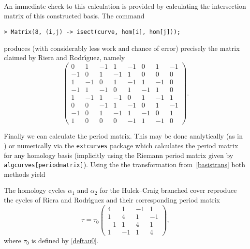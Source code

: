\documentclass[pdftex]{sigma}
\numberwithin{equation}{section}
\begin{document}
An immediate check to this calculation is provided by calculating the
intersection matrix of this constructed basis. The command
\begin{verbatim}
> Matrix(8, (i,j) -> isect(curve, hom[i], hom[j]));
\end{verbatim}
produces (with considerably less work and chance of error) precisely
the matrix claimed by Riera and Rodr{\'{\i}}guez, namely
\[
  \begin{pmatrix}
    0 & 1 & -1 & 1 & -1 & 0 & 1 & -1 \\
    -1 & 0 & 1 & -1 & 1 & 0 & 0 & 0 \\
    1 & -1 & 0 & 1 & -1 & 1 & -1 & 0 \\
    -1 & 1 & -1 & 0 & 1 & -1 & 1 & 0 \\
    1 & -1 & 1 & -1 & 0 & 1 & -1 & 1 \\
    0 & 0 & -1 & 1 & -1 & 0 & 1 & -1 \\
    -1 & 0 & 1 & -1 & 1 & -1 & 0 & 1 \\
    1 & 0 & 0 & 0 & -1 & 1 & -1 & 0
  \end{pmatrix}.
\]

Finally we can calculate the period matrix. This may be done analytically (as in \cite{riera}) or
numerically via the {\tt extcurves} package which calculates the
period matrix for any homology basis (implicitly using the Riemann period matrix given by {\tt algcurves[periodmatrix]}). Using the the
transformation from~\eqref{basistrans} both methods yield

\begin{theorem} The  homology cycles $\alpha_1$ and $\alpha_2$ for the Hulek--Craig
branched cover reproduce the cycles of Riera and Rodr{\'{\i}}guez and their corresponding
period matrix
\[
\tau = \tau_0
\begin{pmatrix}
  4  & 1  & -1 & 1  \\
  1  & 4  & 1  & -1 \\
  -1 & 1  & 4  & 1  \\
  1  & -1 & 1  & 4
\end{pmatrix},
\]
where $\tau_0$ is defined by \eqref{deftau0}.
\end{theorem}
\end{document}

